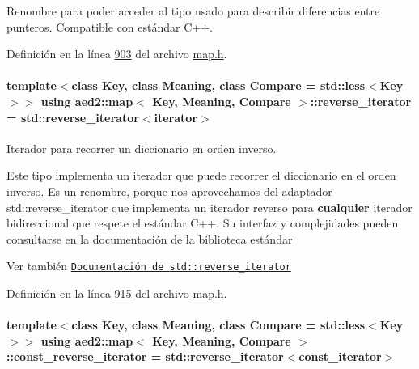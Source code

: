 Renombre para poder acceder al tipo usado para describir diferencias entre punteros. Compatible con estándar C++. 



Definición en la línea \hyperlink{map_8h_source_l00903}{903} del archivo \hyperlink{map_8h_source}{map.\+h}.

\paragraph[{\texorpdfstring{reverse\+\_\+iterator}{reverse_iterator}}]{\setlength{\rightskip}{0pt plus 5cm}template$<$class Key, class Meaning, class Compare = std\+::less$<$\+Key$>$$>$ using {\bf aed2\+::map}$<$ Key, Meaning, Compare $>$\+::{\bf reverse\+\_\+iterator} =  std\+::reverse\+\_\+iterator$<${\bf iterator}$>$}\hypertarget{classaed2_1_1map_a8e6a592062260177fd73b2f9897b1dd5_a8e6a592062260177fd73b2f9897b1dd5}{}\label{classaed2_1_1map_a8e6a592062260177fd73b2f9897b1dd5_a8e6a592062260177fd73b2f9897b1dd5}


Iterador para recorrer un diccionario en orden inverso. 

Este tipo implementa un iterador que puede recorrer el diccionario en el orden inverso. Es un renombre, porque nos aprovechamos del adaptador {\ttfamily std\+::reverse\+\_\+iterator} que implementa un iterador reverso para {\bfseries cualquier} iterador bidireccional que respete el estándar C++. Su interfaz y complejidades pueden consultarse en la documentación de la biblioteca estándar

\begin{DoxySeeAlso}{Ver también}
\href{http://en.cppreference.com/w/cpp/iterator/reverse_iterator}{\tt Documentación de {\ttfamily std\+::reverse\+\_\+iterator}} 
\end{DoxySeeAlso}


Definición en la línea \hyperlink{map_8h_source_l00915}{915} del archivo \hyperlink{map_8h_source}{map.\+h}.

\paragraph[{\texorpdfstring{const\+\_\+reverse\+\_\+iterator}{const_reverse_iterator}}]{\setlength{\rightskip}{0pt plus 5cm}template$<$class Key, class Meaning, class Compare = std\+::less$<$\+Key$>$$>$ using {\bf aed2\+::map}$<$ Key, Meaning, Compare $>$\+::{\bf const\+\_\+reverse\+\_\+iterator} =  std\+::reverse\+\_\+iterator$<${\bf const\+\_\+iterator}$>$}\hypertarget{classaed2_1_1map_aed66a216549d13078a3ea6978ea0b768_aed66a216549d13078a3ea6978ea0b768}{}\label{classaed2_1_1map_aed66a216549d13078a3ea6978ea0b768_aed66a216549d13078a3ea6978ea0b768}



